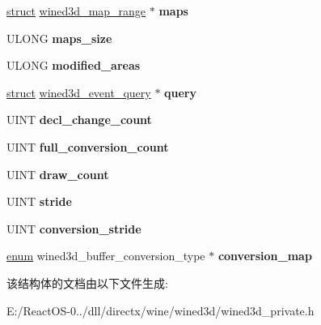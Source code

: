 \begin{DoxyCompactItemize}
\hyperlink{interfacestruct}{struct} \hyperlink{structwined3d__map__range}{wined3d\+\_\+map\+\_\+range} $\ast$ {\bfseries maps}
\item 
\mbox{\label{structwined3d__buffer_ae5cc42d24d780723b535593257936e46}} 
U\+L\+O\+NG {\bfseries maps\+\_\+size}
\item 
\mbox{\label{structwined3d__buffer_a8b5ff068b33bf502435f956bba4b97b3}} 
U\+L\+O\+NG {\bfseries modified\+\_\+areas}
\item 
\mbox{\label{structwined3d__buffer_a4fe4e8a265285039977b1de33d97cb30}} 
\hyperlink{interfacestruct}{struct} \hyperlink{structwined3d__event__query}{wined3d\+\_\+event\+\_\+query} $\ast$ {\bfseries query}
\item 
\mbox{\label{structwined3d__buffer_a4260da761a3203934cf62784f3e8b80c}} 
U\+I\+NT {\bfseries decl\+\_\+change\+\_\+count}
\item 
\mbox{\label{structwined3d__buffer_a63de04d229222991a75cc23419c7768e}} 
U\+I\+NT {\bfseries full\+\_\+conversion\+\_\+count}
\item 
\mbox{\label{structwined3d__buffer_a6edd64cd57ee49dde9bddf6ff9ba0f6a}} 
U\+I\+NT {\bfseries draw\+\_\+count}
\item 
\mbox{\label{structwined3d__buffer_a8926e6245079bf2755960c868f29e608}} 
U\+I\+NT {\bfseries stride}
\item 
\mbox{\label{structwined3d__buffer_a0e44f02682e09b85d18f52836db591fc}} 
U\+I\+NT {\bfseries conversion\+\_\+stride}
\item 
\mbox{\label{structwined3d__buffer_a8810b4891b8fe5745ce5d2ae81a759a8}} 
\hyperlink{interfaceenum}{enum} wined3d\+\_\+buffer\+\_\+conversion\+\_\+type $\ast$ {\bfseries conversion\+\_\+map}
\end{DoxyCompactItemize}


该结构体的文档由以下文件生成\+:\begin{DoxyCompactItemize}
\item 
E\+:/\+React\+O\+S-\/0../dll/directx/wine/wined3d/wined3d\+\_\+private.\+h\end{DoxyCompactItemize}
